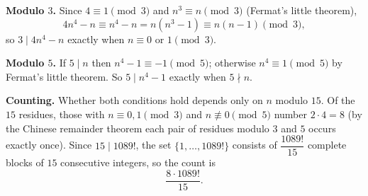 \textbf{Modulo $3$.} Since $4\equiv1\pmod3$ and $n^3\equiv n\pmod 3$ (Fermat's little theorem),
\[4n^4-n\equiv n^4-n=n\left(n^3-1\right)\equiv n(n-1)\pmod 3,\]
so $3\mid 4n^4-n$ exactly when $n\equiv0$ or $1\pmod3$.

\textbf{Modulo $5$.} If $5\mid n$ then $n^4-1\equiv-1\pmod 5$; otherwise $n^4\equiv1\pmod5$ by Fermat's little theorem. So $5\mid n^4-1$ exactly when $5\nmid n$.

\textbf{Counting.} Whether both conditions hold depends only on $n$ modulo $15$. Of the $15$ residues, those with $n\equiv0,1\pmod 3$ and $n\not\equiv0\pmod5$ number $2\cdot4=8$ (by the Chinese remainder theorem each pair of residues modulo $3$ and $5$ occurs exactly once). Since $15\mid1089!$, the set $\{1,\dots,1089!\}$ consists of $\dfrac{1089!}{15}$ complete blocks of $15$ consecutive integers, so the count is
\[\boxed{\dfrac{8\cdot1089!}{15}}.\]
